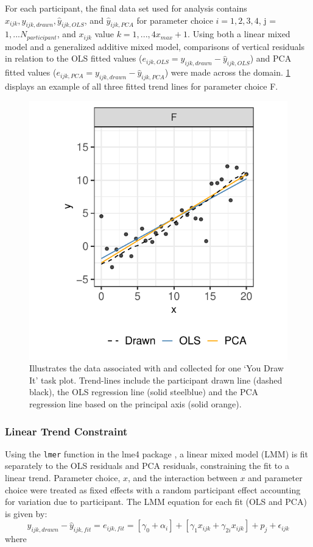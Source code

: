 \documentclass[12pt]{article}
\begin{document}
For each participant, the final data set used for analysis contains
\(x_{ijk}, y_{ijk,drawn}, \hat y_{ijk,OLS}\), and \(\hat y_{ijk,PCA}\)
for parameter choice \(i = 1,2,3,4\), j = \(1,...N_{participant}\), and
\(x_{ijk}\) value \(k = 1, ...,4 x_{max} + 1\). Using both a linear
mixed model and a generalized additive mixed model, comparisons of
vertical residuals in relation to the OLS fitted values
(\(e_{ijk,OLS} = y_{ijk,drawn} - \hat y_{ijk,OLS}\)) and PCA fitted
values (\(e_{ijk,PCA} = y_{ijk,drawn} - \hat y_{ijk,PCA}\)) were made
across the domain. \cref{fig:eyefitting-example-plot} displays an
example of all three fitted trend lines for parameter choice F.

\begin{figure}[tbp]

{\centering \includegraphics[width=0.5\linewidth,]{Eye-Fitting-Straight-Lines-in-the-Modern-Era_files/figure-latex/eyefitting-example-plot-1} 

}

\caption{Illustrates the data associated with and collected for one `You Draw It' task plot. Trend-lines include the participant drawn line (dashed black), the OLS regression line (solid steelblue) and the PCA regression line based on the principal axis (solid orange).}\label{fig:eyefitting-example-plot}
\end{figure}

\hypertarget{linear-trend-constraint}{%
\subsubsection{Linear Trend Constraint}\label{linear-trend-constraint}}

Using the \texttt{lmer} function in the lme4 package \citep{lme4}, a
linear mixed model (LMM) is fit separately to the OLS residuals and PCA
residuals, constraining the fit to a linear trend. Parameter choice,
\(x\), and the interaction between \(x\) and parameter choice were
treated as fixed effects with a random participant effect accounting for
variation due to participant. The LMM equation for each fit (OLS and
PCA) is given by: \begin{equation}
y_{ijk,drawn} - \hat y_{ijk,fit} = e_{ijk,fit} = \left[\gamma_0 + \alpha_i\right] + \left[\gamma_{1} x_{ijk} + \gamma_{2i} x_{ijk}\right] + p_{j} + \epsilon_{ijk}
\end{equation} \noindent where
\end{document}
